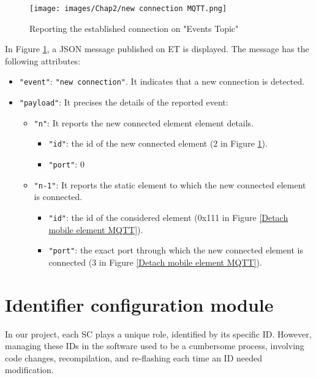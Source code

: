 \begin{figure}[H]
\begin{center}
\texttt{[image: images/Chap2/new connection MQTT.png]}\\
\caption{Reporting the established connection on "Events Topic"}
\label{new connection MQTT}
\end{center}
\end{figure}

In Figure \ref{new connection MQTT}, a JSON message published on ET is displayed. The message has the following attributes:
\newpage

\begin{itemize}
    \item \texttt{"event"}: \texttt{"new connection"}. It indicates that a new connection is detected.
    \item \texttt{"payload"}: It precises the details of the reported event:
    \begin{itemize}
        \item \texttt{"n"}: It reports the new connected element element details.
        \begin{itemize}
            \item \texttt{"id"}: the id of the new connected element (2 in Figure \ref{new connection MQTT}).
            \item \texttt{"port"}: 0
        \end{itemize}
        \item \texttt{"n-1"}: It reports the static element to which the new connected element is connected.
        \begin{itemize}
            \item \texttt{"id"}: the id of the considered element (0x111 in Figure \ref{Detach mobile element MQTT}).
            \item \texttt{"port"}: the exact port through which the new connected element is connected (3 in Figure \ref{Detach mobile element MQTT}).
        \end{itemize}
    \end{itemize}
\end{itemize}

\section{Identifier configuration module}

In our project, each SC plays a unique role, identified by its specific ID. However, managing these IDs in the software used to be a cumbersome process, involving code changes, recompilation, and re-flashing each time an ID needed modification.

